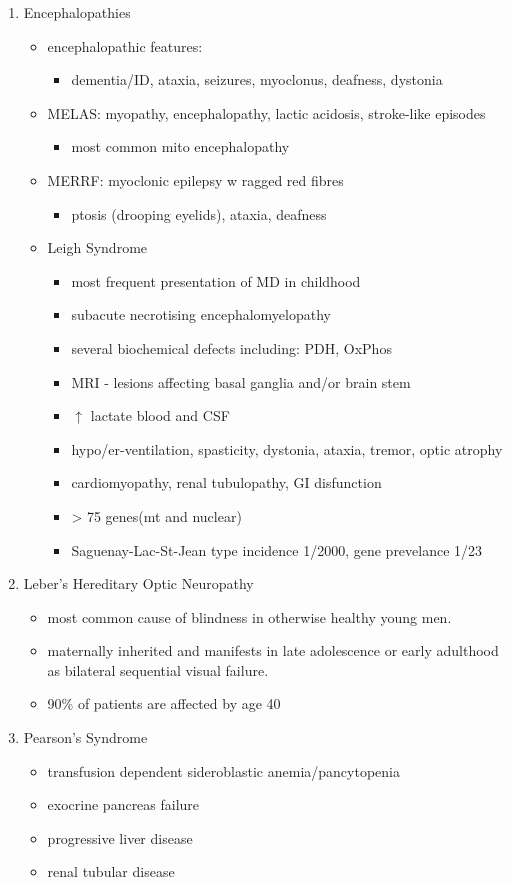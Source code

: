 \documentclass{scrartcl}
\begin{document}
\begin{enumerate}
\item Encephalopathies
\label{sec:org9f5e48e}
\begin{itemize}
\item encephalopathic features:
\begin{itemize}
\item dementia/ID, ataxia, seizures, myoclonus, deafness, dystonia
\end{itemize}
\item MELAS: myopathy, encephalopathy, lactic acidosis, stroke-like episodes
\begin{itemize}
\item most common mito encephalopathy
\end{itemize}
\item MERRF: myoclonic epilepsy w ragged red fibres
\begin{itemize}
\item ptosis (drooping eyelids), ataxia, deafness
\end{itemize}
\item Leigh Syndrome
\begin{itemize}
\item most frequent presentation of MD in childhood
\item subacute necrotising encephalomyelopathy
\item several biochemical defects including: PDH, OxPhos
\item MRI - lesions affecting basal ganglia and/or brain stem
\item \(\uparrow\) lactate blood and CSF
\item hypo/er-ventilation, spasticity, dystonia, ataxia, tremor, optic atrophy
\item cardiomyopathy, renal tubulopathy, GI disfunction
\item \textgreater{} 75 genes(mt and nuclear)
\item Saguenay-Lac-St-Jean type incidence 1/2000, gene prevelance 1/23
\end{itemize}
\end{itemize}
\item Leber’s Hereditary Optic Neuropathy
\label{sec:org95bb616}
\begin{itemize}
\item most common cause of blindness in otherwise healthy young men.
\item maternally inherited and manifests in late adolescence or early
adulthood as bilateral sequential visual failure.
\item 90\% of patients are affected by age 40
\end{itemize}

\item Pearson's Syndrome
\label{sec:orgd3b7c76}
\begin{itemize}
\item transfusion dependent sideroblastic anemia/pancytopenia
\item exocrine pancreas failure
\item progressive liver disease
\item renal tubular disease
\end{itemize}
\end{enumerate}
\end{document}
